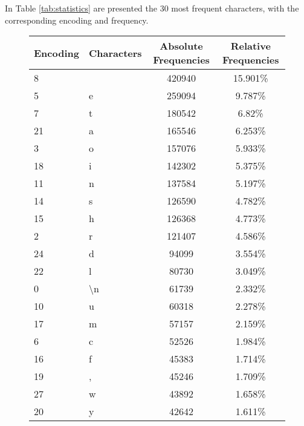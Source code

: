 \documentclass[a4paper,12pt]{article} %
\begin{document}
	In Table \ref{tab:statistics} are presented the $30$ most frequent 
	characters, with the corresponding encoding and frequency.
	
	\begin{figure}[htb]
	\centering
	\begin{tabular}{llcc}
		\toprule
		Encoding & Characters &  Absolute Frequencies & Relative Frequencies \\
		\midrule
		8        &           &              420940 &            15.901\% \\
		5        &         e &              259094 &             9.787\% \\
		7        &         t &              180542 &              6.82\% \\
		21       &         a &              165546 &             6.253\% \\
		3        &         o &              157076 &             5.933\% \\
		18       &         i &              142302 &             5.375\% \\
		11       &         n &              137584 &             5.197\% \\
		14       &         s &              126590 &             4.782\% \\
		15       &         h &              126368 &             4.773\% \\
		2        &         r &              121407 &             4.586\% \\
		24       &         d &               94099 &             3.554\% \\
		22       &         l &               80730 &             3.049\% \\
		0        &        \textbackslash n &               61739 &             
		2.332\% \\
		10       &         u &               60318 &             2.278\% \\
		17       &         m &               57157 &             2.159\% \\
		6        &         c &               52526 &             1.984\% \\
		16       &         f &               45383 &             1.714\% \\
		19       &         , &               45246 &             1.709\% \\
		27       &         w &               43892 &             1.658\% \\
		20       &         y &               42642 &             1.611\% \\

\end{tabular}
\end{figure}
\end{document}
